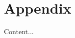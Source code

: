 \documentclass[../../../main.tex]{subfiles}
\begin{document}
	\chapter{Appendix}
	Content...
\end{document}
